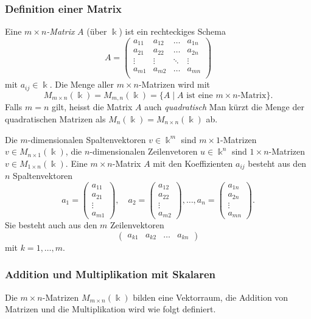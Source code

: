 \subsubsection{Definition einer Matrix}
\begin{definition}
Eine {\em $m\times n$-Matrix} $A$ (über $\Bbbk$) ist ein rechteckiges Schema
%
\[
A
=
\begin{pmatrix}
a_{11}&a_{12}&\dots &a_{1n}\\
a_{21}&a_{22}&\dots &a_{2n}\\
\vdots&\vdots&\ddots&\vdots\\
a_{m1}&a_{m2}&\dots &a_{mn}\\
\end{pmatrix}
\]
mit $a_{ij}\in\Bbbk$.
Die Menge aller $m\times n$-Matrizen wird mit
\[
M_{m\times n}(\Bbbk)
=
M_{m,n}(\Bbbk)
=
\{ A\;|\; \text{$A$ ist eine $m\times n$-Matrix}\}.
\]
Falls $m=n$ gilt, heisst die Matrix $A$ auch {\em quadratisch}
%
Man kürzt die Menge der quadratischen Matrizen als
$M_n(\Bbbk) = M_{n\times n}(\Bbbk)$ ab.
\end{definition}

Die $m$-dimensionalen Spaltenvektoren $v\in \Bbbk^m$ sind $m\times 1$-Matrizen
$v\in M_{n\times 1}(\Bbbk)$, die $n$-dimensionalen Zeilenvetoren $u\in\Bbbk^n$
sind $1\times n$-Matrizen $v\in M_{1\times n}(\Bbbk)$.
Eine $m\times n$-Matrix $A$ mit den Koeffizienten $a_{ij}$ besteht aus
den $n$ Spaltenvektoren
\[
a_1 = \begin{pmatrix} a_{11} \\ a_{21} \\ \vdots \\ a_{m1} \end{pmatrix},\quad
a_2 = \begin{pmatrix} a_{12} \\ a_{22} \\ \vdots \\ a_{m2} \end{pmatrix},\dots,
a_n = \begin{pmatrix} a_{1n} \\ a_{2n} \\ \vdots \\ a_{mn} \end{pmatrix}.
\]
Sie besteht auch aus den $m$ Zeilenvektoren
\[
\begin{pmatrix} a_{k1} & a_{k2} & \dots & a_{kn} \end{pmatrix}
\]
mit $k=1,\dots,m$.

\subsubsection{Addition und Multiplikation mit Skalaren}
Die $m\times n$-Matrizen $M_{m\times n}(\Bbbk)$ bilden eine Vektorraum,
die Addition von Matrizen und die Multiplikation wird wie folgt definiert.

